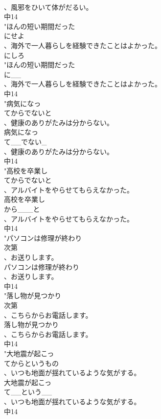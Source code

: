 \documentclass[8pt]{extreport}
\begin{document}
\begin{CJK}{UTF8}{min}
\\	、風邪をひいて体がだるい。
\\	中14
\\	"ほんの短い期間だった
\\	にせよ
\\	、海外で一人暮らしを経験できたことはよかった。
\\	にしろ
\\	"ほんの短い期間だった
\\	に__
\\	、海外で一人暮らしを経験できたことはよかった。
\\	中14
\\	"病気になっ
\\	てからでないと
\\	、健康のありがたみは分からない。
\\	病気になっ
\\	て__でない_
\\	、健康のありがたみは分からない。
\\	中14
\\	"高校を卒業し
\\	てからでないと
\\	、アルバイトをやらせてもらえなかった。
\\	高校を卒業し
\\	から___と
\\	、アルバイトをやらせてもらえなかった。
\\	中14
\\	"パソコンは修理が終わり
\\	次第
\\	、お送りします。
\\	パソコンは修理が終わり
\\	、お送りします。
\\	中14
\\	"落し物が見つかり
\\	次第
\\	、こちらからお電話します。
\\	落し物が見つかり
\\	、こちらからお電話します。
\\	中14
\\	"大地震が起こっ
\\	てからというもの
\\	、いつも地面が揺れているような気がする。
\\	大地震が起こっ
\\	て__という__
\\	、いつも地面が揺れているような気がする。
\\	中14

\end{CJK}
\end{document}

